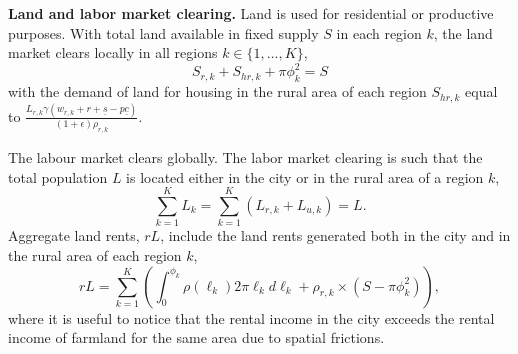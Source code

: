 \documentclass[20250130-paper.tex]{subfiles}
\begin{document}
\textbf{Land and labor market clearing.} Land is used for residential or productive purposes. With total land available in fixed supply $S$ in each region $k$, the land market clears locally in all regions $k \in \{1,..., K\}$,
\begin{equation}
S_{r,k}+S_{hr,k}+\pi\phi_k^2 = S \label{eq:landmarketclearing}
\end{equation}
with the demand of land for housing in the rural area of each region $S_{hr,k}$ equal to $\frac{L_{r,k} \gamma \left( w_{r,k}+r+ \underline{s}-p\underline{c}\right)}{(1+\epsilon) \rho_{r,k}}$.

The labour market clears globally. The labor market clearing is such that the total population $L$ is located either in the city or in the rural area of a region $k$,
\begin{equation}
\sum_{k=1}^{K}L_k=\sum_{k=1}^{K}(L_{r,k}+L_{u,k})=L. \label{eq:labormarketclearing}
\end{equation}
Aggregate land rents, $rL$, include the land rents generated both in the city and in the rural area of each region $k$,
\begin{equation}
rL=\sum_{k=1}^K\left(\int_{0}^{\phi_k} \rho(\ell_k)2\pi\ell_k d\ell_k+\rho_{r,k} \times (S-\pi\phi_k^2)\right), \label{eq:rL}
\end{equation} 
where it is useful to notice that the rental income in the city exceeds the rental income of farmland for the same area due to spatial frictions.





\end{document}
